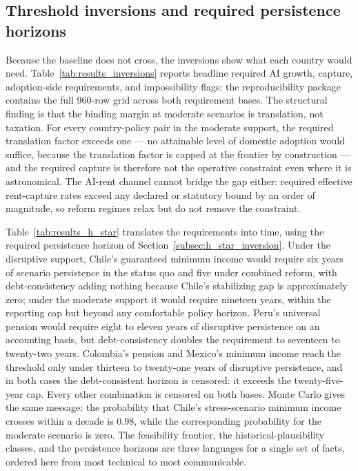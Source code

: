 \documentclass[11pt,a4paper]{article}
\begin{document}

\subsection{Threshold inversions and required persistence horizons}\label{subsec:results_inversions}

Because the baseline does not cross, the inversions show what each country would need.
Table~\ref{tab:results_inversions} reports headline required AI growth, capture, adoption-side
requirements, and impossibility flags; the reproducibility package contains the full 960-row
grid across both requirement bases.
The structural finding is that the binding margin at moderate scenarios is translation, not
taxation. For every country-policy pair in the moderate support, the required translation
factor exceeds one --- no attainable level of domestic adoption would suffice, because the
translation factor is capped at the frontier by construction --- and the required capture is
therefore not the operative constraint even where it is astronomical. The AI-rent channel
cannot bridge the gap either: required effective rent-capture rates exceed any declared or
statutory bound by an order of magnitude, so reform regimes relax but do not remove the
constraint.

Table~\ref{tab:results_h_star} translates the requirements into time, using the
required persistence horizon of Section~\ref{subsec:h_star_inversion}. Under the disruptive
support, Chile's guaranteed minimum income would require six years of scenario persistence
in the status quo and five under combined reform, with debt-consistency adding nothing
because Chile's stabilizing gap is approximately zero; under the moderate support it would
require nineteen years, within the reporting cap but beyond any comfortable policy horizon.
Peru's universal pension would require eight to eleven years of disruptive persistence on an
accounting basis, but debt-consistency doubles the requirement to seventeen to twenty-two
years. Colombia's pension and Mexico's minimum income reach the threshold only under
thirteen to twenty-one years of disruptive persistence, and in both cases the
debt-consistent horizon is censored: it exceeds the twenty-five-year cap. Every other
combination is censored on both bases. Monte Carlo gives the same message:
the probability that Chile's stress-scenario minimum income crosses within a decade is
$0.98$, while the corresponding probability for the moderate scenario is zero. The
feasibility frontier, the historical-plausibility classes, and the persistence horizons are
three languages for a single set of facts, ordered here from most technical to most
communicable.
\end{document}
